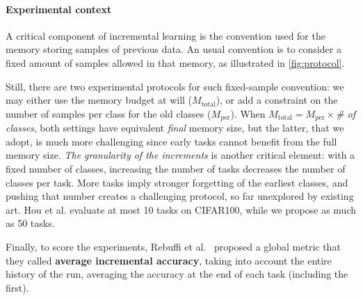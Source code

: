 \paragraph{Experimental context} A critical component of incremental learning is the convention used
for the memory storing samples of previous data. An usual convention is to consider a fixed amount
of samples allowed in that memory, as illustrated in \autoref{fig:protocol}.

Still, there are two experimental protocols for such fixed-sample convention: we may either use the
memory budget at will ($M_\mathrm{total}$), or add a constraint on the number of samples per class
for the old classes ($M_\mathrm{per}$). When $M_\mathrm{total}=M_\mathrm{per}\times$\textit{\# of
    classes}, both settings have equivalent \textit{final} memory size, but the latter, that we adopt,
is much more challenging since early tasks cannot benefit from the full memory size. \textit{The
    granularity of the increments} is another critical element: with a fixed number of classes,
increasing the number of tasks decreases the number of classes per task. More tasks imply stronger
forgetting of the earliest classes, and pushing that number creates a challenging protocol, so far
unexplored by existing art. Hou et al. evaluate at most 10 tasks on CIFAR100, while we propose as
much as 50 tasks.

Finally, to score the experiments, Rebuffi et al.~\citep{rebuffi2017icarl} proposed a global metric
that they called \textbf{average incremental accuracy}, taking into account the entire history of
the run, averaging the accuracy at the end of each task (including the first).

